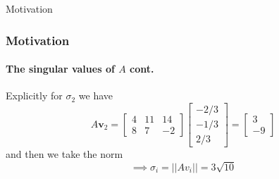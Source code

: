 \documentclass{beamer}
\begin{document}

\begin{frame}{Motivation}

\frametitle{Motivation}
\framesubtitle{The singular values of $A$ cont.}
Explicitly for $\sigma_2$ we have
\begin{equation*}
A\mathbf{v}_2 = 
\begin{bmatrix}4 & 11 & 14 \\8 & 7 & -2 \end{bmatrix}
\begin{bmatrix}-2/3 \\ -1/3 \\ 2/3 \end{bmatrix} =
\begin{bmatrix}3 \\ -9 \end{bmatrix}
\end{equation*}
and then we take the norm
\begin{equation*}
\implies
 \sigma_i = ||Av_i|| = 3\sqrt{10}
\end{equation*}


\end{frame}

\end{document}
